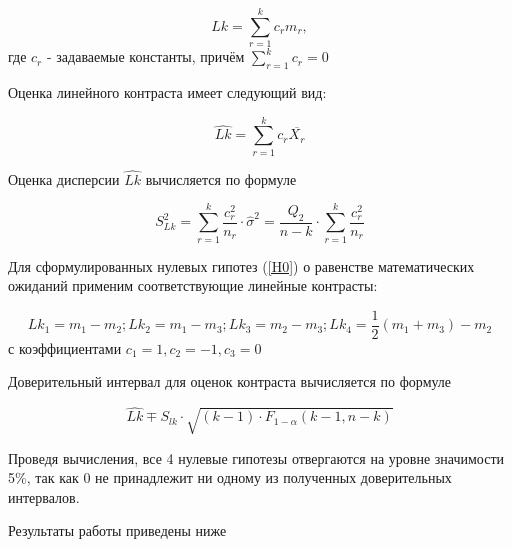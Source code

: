 \begin{equation}
	Lk = \sum\limits_{r=1}^k c_r m_r,
\end{equation}
где $c_r$ - задаваемые константы, причём $\sum\limits_{r=1}^k c_r = 0$

Оценка линейного контраста имеет следующий вид:

\begin{equation}
	\hat{Lk} = \sum\limits_{r=1}^k c_r \overline{X_r}
\end{equation}

Оценка дисперсии $\hat{Lk}$ вычисляется по формуле

\begin{equation}
	S^2_{Lk} = \sum\limits_{r=1}^k \frac{c^2_r}{n_r} \cdot \hat{\sigma}^2 = \frac{Q_2}{n - k} \cdot \sum\limits_{r=1}^k \frac{c^2_r}{n_r}
\end{equation}

Для сформулированных нулевых гипотез (\ref{H0}) о равенстве математических ожиданий применим соответствующие линейные контрасты:

\begin{equation}
	Lk_1 = m_1 - m_2; Lk_2 = m_1 - m_3; Lk_3 = m_2 - m_3; Lk_4 = \frac{1}{2} (m_1 + m_3) - m_2
\end{equation}
с коэффициентами $c_1 = 1, c_2 = -1, c_3 = 0$

Доверительный интервал для оценок контраста вычисляется по формуле

\begin{equation}
	\hat{Lk} \mp S_{lk} \cdot \sqrt{(k - 1) \cdot F_{1-\alpha}(k - 1, n - k)}
\end{equation}

Проведя вычисления, все 4 нулевые гипотезы отвергаются на уровне значимости 5\%, так как $0$ не принадлежит ни одному из полученных доверительных интервалов.

Результаты работы приведены ниже

